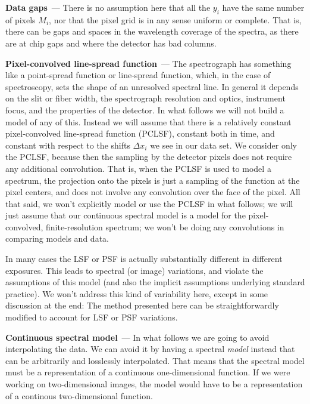 \documentclass[modern]{aastex631}
\renewcommand{\paragraph}[1]{\medskip\par\noindent\textbf{#1}~---}
\begin{document}
\paragraph{Data gaps}
There is no assumption here that all the $y_i$ have the same number of pixels $M_i$, nor that the pixel grid is in any sense uniform or complete.
That is, there can be gaps and spaces in the wavelength coverage of the spectra, as there are at chip gaps and where the detector has bad columns.

\paragraph{Pixel-convolved line-spread function}
The spectrograph has something like a point-spread function or line-spread function, which, in the case of spectroscopy, sets the shape of an unresolved spectral line.
In general it depends on the slit or fiber width, the spectrograph resolution and optics, instrument focus, and the properties of the detector.
In what follows we will not build a model of any of this.
Instead we will assume that there is a relatively constant pixel-convolved line-spread function (PCLSF), constant both in time, and constant with respect to the shifts $\Delta x_i$ we see in our data set.
We consider only the PCLSF, because then the sampling by the detector pixels does not require any additional convolution.
That is, when the PCLSF is used to model a spectrum, the projection onto the pixels is just a sampling of the function at the pixel centers, and does not involve any convolution over the face of the pixel.
All that said, we won't explicitly model or use the PCLSF in what follows; we will just assume that our continuous spectral model is a model for the pixel-convolved, finite-resolution spectrum; we won't be doing any convolutions in comparing models and data.

In many cases the LSF or PSF is actually substantially different in different exposures.
This leads to spectral (or image) variations, and violate the assumptions of this model (and also the implicit assumptions underlying standard practice).
We won't address this kind of variability here, except in some discussion at the end:
The method presented here can be straightforwardly modified to account for LSF or PSF variations.

\paragraph{Continuous spectral model} 
In what follows we are going to avoid interpolating the data.
We can avoid it by having a spectral \emph{model} instead that can be arbitrarily and losslessly interpolated.
That means that the spectral model must be a representation of a continuous one-dimensional function.
If we were working on two-dimensional images, the model would have to be a representation of a continous two-dimensional function.
\end{document}
